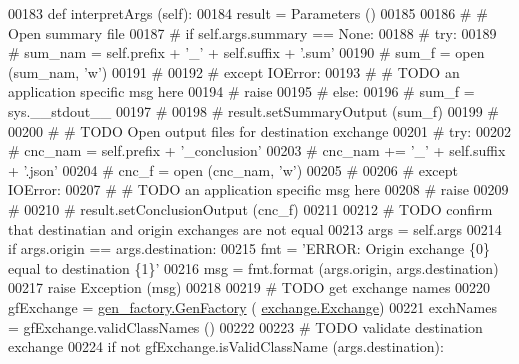 \begin{DoxyCode}
00183     \textcolor{keyword}{def }interpretArgs (self):
00184         result = Parameters ()
00185         
00186 \textcolor{comment}{#        # Open summary file}
00187 \textcolor{comment}{#        if self.args.summary == None:}
00188 \textcolor{comment}{#            try:}
00189 \textcolor{comment}{#                sum\_nam =  self.prefix + '\_' + self.suffix + '.sum'}
00190 \textcolor{comment}{#                sum\_f = open (sum\_nam, 'w')}
00191 \textcolor{comment}{#                }
00192 \textcolor{comment}{#            except IOError:}
00193 \textcolor{comment}{#                # TODO an application specific msg here}
00194 \textcolor{comment}{#                raise}
00195 \textcolor{comment}{#        else:}
00196 \textcolor{comment}{#            sum\_f = sys.\_\_stdout\_\_}
00197 \textcolor{comment}{#            }
00198 \textcolor{comment}{#        result.setSummaryOutput (sum\_f)}
00199 \textcolor{comment}{#            }
00200 \textcolor{comment}{#        # TODO Open output files for destination exchange}
00201 \textcolor{comment}{#        try:}
00202 \textcolor{comment}{#            cnc\_nam  =  self.prefix + '\_conclusion'}
00203 \textcolor{comment}{#            cnc\_nam += '\_' + self.suffix + '.json'}
00204 \textcolor{comment}{#            cnc\_f = open (cnc\_nam, 'w')}
00205 \textcolor{comment}{#            }
00206 \textcolor{comment}{#        except IOError:}
00207 \textcolor{comment}{#            # TODO an application specific msg here}
00208 \textcolor{comment}{#            raise}
00209 \textcolor{comment}{#            }
00210 \textcolor{comment}{#        result.setConclusionOutput (cnc\_f)}
00211             
00212         \textcolor{comment}{# TODO confirm that destinatian and origin exchanges are not equal}
00213         args = self.args 
00214         \textcolor{keywordflow}{if} args.origin == args.destination:
00215             fmt = \textcolor{stringliteral}{'ERROR: Origin exchange \{0\} equal to destination \{1\}'}
00216             msg = fmt.format (args.origin, args.destination)
00217             \textcolor{keywordflow}{raise} Exception (msg)
00218 
00219         \textcolor{comment}{# TODO get exchange names }
00220         gfExchange = \hyperlink{classgen__factory_1_1_gen_factory}{gen\_factory.GenFactory} (
      \hyperlink{classexchange_1_1_exchange}{exchange.Exchange})
00221         exchNames = gfExchange.validClassNames ()
00222         
00223         \textcolor{comment}{# TODO validate destination exchange}
00224         \textcolor{keywordflow}{if} \textcolor{keywordflow}{not} gfExchange.isValidClassName (args.destination):

\end{DoxyCode}
